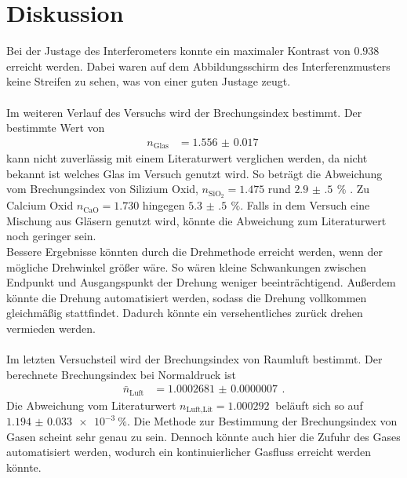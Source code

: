\newpage
\section{Diskussion}
\label{sec:diskussion}
Bei der Justage des Interferometers konnte ein maximaler Kontrast von $0.938$ erreicht werden.
Dabei waren auf dem Abbildungsschirm des Interferenzmusters keine Streifen zu sehen, was von einer guten Justage zeugt.\\\\
Im weiteren Verlauf des Versuchs wird der Brechungsindex bestimmt.
Der bestimmte Wert von 
\begin{align}
    n_\text{Glas} &= \SI{1.556(17)}{}
\end{align}
kann nicht zuverlässig mit einem Literaturwert verglichen werden, da nicht bekannt ist welches Glas im Versuch genutzt wird.
So beträgt die Abweichung vom Brechungsindex von Silizium Oxid, $n_{\text{SiO}_2} = 1.475$ rund $\SI{2.9(5)}{} \,\%$ \cite{Teschner2019}.
Zu Calcium Oxid $n_\text{CaO} = 1.730$ hingegen $\SI{5.3(5)}{}\,\%$.
Falls in dem Versuch eine Mischung aus Gläsern genutzt wird, könnte die Abweichung zum Literaturwert noch geringer sein.\\
Bessere Ergebnisse könnten durch die Drehmethode erreicht werden, wenn der mögliche Drehwinkel größer wäre.
So wären kleine Schwankungen zwischen Endpunkt und Ausgangspunkt der Drehung weniger beeinträchtigend.
Außerdem könnte die Drehung automatisiert werden, sodass die Drehung vollkommen gleichmäßig stattfindet.
Dadurch könnte ein versehentliches zurück drehen vermieden werden.\\\\
Im letzten Versuchsteil wird der Brechungsindex von Raumluft bestimmt.
Der berechnete Brechungsindex bei Normaldruck ist
\begin{align*}
    \bar{n}_\text{Luft} &= \SI{1.0002681(07)}{}\,.
\end{align*}
Die Abweichung vom Literaturwert ${n_\text{Luft,Lit} = \SI{1.000292}{}}$ \cite{Dem2} beläuft sich so auf ${\SI{1.194(33)e-3}{\percent}}$.
Die Methode zur Bestimmung der Brechungsindex von Gasen scheint sehr genau zu sein.
Dennoch könnte auch hier die Zufuhr des Gases automatisiert werden, wodurch ein kontinuierlicher Gasfluss erreicht werden könnte.
